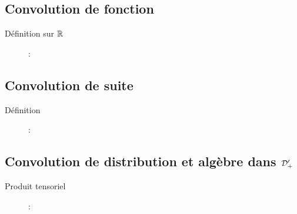 \subsection{Convolution de fonction}
\begin{description}
\item[Définition sur $\mathbb{R}$] : 
\end{description}

\subsection{Convolution de suite}
\begin{description}
\item[Définition] : 
\end{description}

\subsection{Convolution de distribution et algèbre dans $\mathcal{D}'_+$}
\begin{description}
\item[Produit tensoriel] : 
\end{description}
